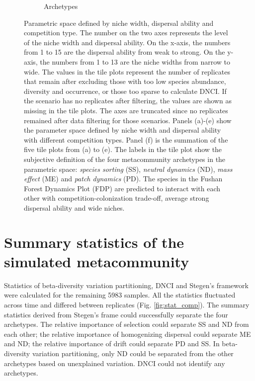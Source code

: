\begin{figure}
\begin{subfigure}[b]{0.45\linewidth}
		\caption{Archetypes}
		\label{fig:para-arch}
	\end{subfigure}
	\caption[Parametric space defined by niche width, dispersal ability and competition type.]{\small
		Parametric space defined by niche width, dispersal ability and competition type. The number on the two axes represents the level of the niche width and dispersal ability. On the x-axis, the numbers from 1 to 15 are the dispersal ability from weak to strong. On the y-axis, the numbers from 1 to 13 are the niche widths from narrow to wide. The values in the tile plots represent the number of replicates that remain after excluding those with too low species abundance, diversity and occurrence, or those too sparse to calculate DNCI. If the scenario has no replicates after filtering, the values are shown as missing in the tile plots. The axes are truncated since no replicates remained after data filtering for those scenarios. Panels (a)-(e) show the parameter space defined by niche width and dispersal ability with different competition types. Panel (f) is the summation of the five tile plots from (a) to (e). The labels in the tile plot show the subjective definition of the four metacommunity archetypes in the parametric space: \textit{species sorting} (SS), \textit{neutral dynamics} (ND), \textit{mass effect} (ME) and \textit{patch dynamics} (PD). The species in the Fushan Forest Dynamics Plot (FDP) are predicted to interact with each other with competition-colonization trade-off, average strong dispersal ability and wide niches.}
	\label{fig:para}
\end{figure}
%

\section{Summary statistics of the simulated metacommunity}
\noindent
Statistics of beta-diversity variation partitioning, DNCI and Stegen's framework were calculated for the remaining 5983 samples. All the statistics fluctuated across time and differed between replicates (Fig. \ref{fig:stat_comp}). The summary statistics derived from Stegen's frame could successfully separate the four archetypes. The relative importance of selection could separate SS and ND from each other; the relative importance of homogenizing dispersal could separate ME and ND; the relative importance of drift could separate PD and SS. In beta-diversity variation partitioning, only ND could be separated from the other archetypes based on unexplained variation. DNCI could not identify any archetypes.

